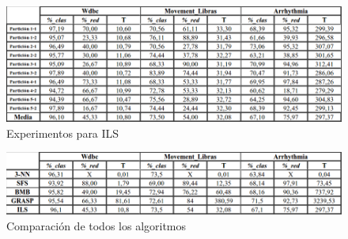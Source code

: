 \begin{figure} [H]
\centering
\includegraphics[width=1.0\linewidth]{ILS}
\caption{Experimentos para ILS}
\label{fig:ILS}
\end{figure}

\begin{figure} [H]
\centering
\includegraphics[width=1.0\linewidth]{TODOS}
\caption{Comparación de todos los algoritmos}
\label{fig:TODOS}
\end{figure}

